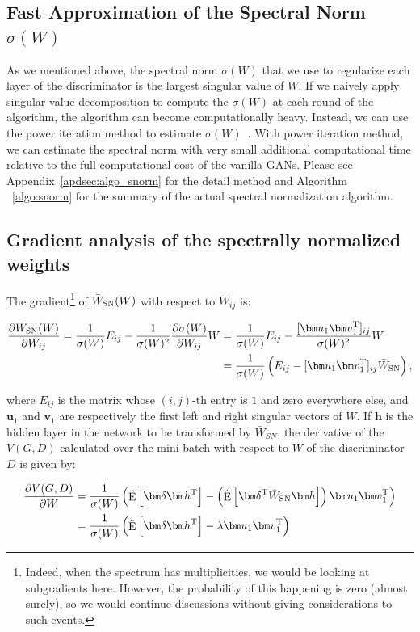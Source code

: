 \subsection{Fast Approximation of the Spectral Norm $\sigma(W)$}
As we mentioned above, the spectral norm $\sigma(W)$ that we use to regularize each layer of the discriminator is the largest singular value of $W$. If we naively apply singular value decomposition to compute the $\sigma(W)$ at each round of the algorithm, the algorithm can become computationally heavy. Instead, we can use the power iteration method to estimate $\sigma(W)$~\cite[]{golub2000eigenvalue, yoshida2017spectral}. With power iteration method, we can estimate the spectral norm with very small additional computational time relative to the full computational cost of the vanilla GANs. Please see Appendix~\ref{apdsec:algo_snorm} for the detail method and Algorithm ~\ref{algo:snorm} for the summary of the actual spectral normalization algorithm.

\subsection{Gradient analysis of the spectrally normalized weights \label{subsec:grad}}
The gradient\footnote{Indeed, when the spectrum has multiplicities, we would be looking at subgradients here. However, the probability of this happening is zero (almost surely), so we would continue discussions without giving considerations to such events.} of $\bar{W}_{\rm SN}(W)$ with respect to $W_{ij}$ is:

\begin{align}
	\frac{\partial \bar{W}_{\rm SN}(W)}{\partial W_{ij}} = \frac{1}{\sigma(W)}E_{ij} - \frac{1}{\sigma(W)^2} \frac{\partial \sigma(W)}{\partial W_{ij}} W &=\frac{1}{\sigma(W)}E_{ij} - \frac{[{\bm u}_{1}{\bm v}_{1}^{\rm T}]_{ij}} {\sigma(W)^2} W \\
    &= \frac{1}{\sigma(W)}\left(E_{ij} - [{\bm u}_{1}{\bm v}_{1}^{\rm T}]_{ij} \bar{W}_{\rm SN}\right),
\end{align}

where $E_{ij}$ is the matrix whose $(i,j)$-th entry is $1$ and zero everywhere else, and ${\bm u}_1$ and ${\bm v}_1$ are respectively the first left and right singular vectors of $W$. If ${\bm h}$ is the hidden layer in the network to be transformed by $\bar{W}_{SN}$, the derivative of the $V(G,D)$ calculated over the mini-batch with respect to $W$ of the discriminator $D$ is given by:

\begin{align}
 \frac{\partial V(G,D)}{\partial W} &= \frac{1}{\sigma(W)} \left(\hat{\mathop{\mathrm{E}}}\left[{\bm \delta} {\bm h}^{\rm T}\right] - \left(\hat{\mathop{\mathrm{E}}}\left[{\bm \delta}^{\rm T} \bar{W}_{\rm SN}{\bm h} \right] \right) {\bm u}_1 {\bm v}_1^{\rm T} \right) \\
 &=\frac{1}{\sigma(W)} \left(\hat{\mathop{\mathrm{E}}}\left[{\bm \delta} {\bm h}^{\rm T}\right] - \lambda {\bm u}_1 {\bm v}_1^{\rm T} \right) \label{eq:grad_sn}
\end{align}

